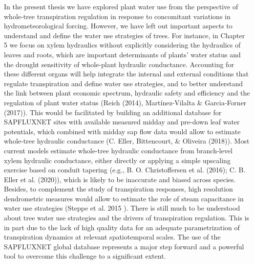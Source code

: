\documentclass[11pt,twoside]{reedthesis}
\begin{document}
In the present thesis we have explored plant water use from the
perspective of whole-tree transpiration regulation in response to
concomitant variations in hydrometeorological forcing. However, we have
left out important aspects to understand and define the water use
strategies of trees. For instance, in Chapter 5 we focus on xylem
hydraulics without explicitly considering the hydraulics of leaves and
roots, which are important determinants of plants' water status and the
drought sensitivity of whole-plant hydraulic conductance. Accounting for
these different organs will help integrate the internal and external
conditions that regulate transpiration and define water use strategies,
and to better understand the link between plant economic spectrum,
hydraulic safety and efficiency and the regulation of plant water status
(Reich (2014), Martínez-Vilalta \& Garcia-Forner (2017)). This would be
facilitated by building an additional database for SAPFLUXNET sites with
available measured midday and pre-down leaf water potentials, which
combined with midday sap flow data would allow to estimate whole-tree
hydraulic conductance (C. Eller, Bittencourt, \& Oliveira (2018)). Most
current models estimate whole-tree hydraulic conductance from
branch-level xylem hydraulic conductance, either directly or applying a
simple upscaling exercise based on conduit tapering (e.g., B. O.
Christoffersen et al. (2016); C. B. Eller et al. (2020)), which is
likely to be inaccurate and biased across species. Besides, to
complement the study of transpiration responses, high resolution
dendrometric measures would allow to estimate the role of steam
capacitance in water use strategies (Steppe et al. 2015 ). There is
still much to be understood about tree water use strategies and the
drivers of transpiration regulation. This is in part due to the lack of
high quality data for an adequate parametrization of transpiration
dynamics at relevant spatiotemporal scales. The use of the SAPFLUXNET
global database represents a major step forward and a powerful tool to
overcome this challenge to a significant extent.\par
\newpage
\end{document}
